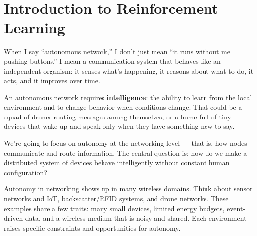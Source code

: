 \chapter{Introduction to Reinforcement Learning}
When I say “autonomous network,” I don’t just mean “it runs without me pushing buttons.” I mean a communication system that behaves like an independent organism: it senses what’s happening, it reasons about what to do, it acts, and it improves over time. 

\begin{redbar}
An autonomous network requires \textbf{intelligence}: the ability to learn from the local environment and to change behavior when conditions change. That could be a squad of drones routing messages among themselves, or a home full of tiny devices that wake up and speak only when they have something new to say.
\end{redbar}

We’re going to focus on autonomy at the networking level — that is, how nodes communicate and route information. The central question is: how do we make a distributed system of devices behave intelligently without constant human configuration?

Autonomy in networking shows up in many wireless domains. Think about sensor networks and IoT, backscatter/RFID systems, and drone networks. These examples share a few traits: many small devices, limited energy budgets, event-driven data, and a wireless medium that is noisy and shared. Each environment raises specific constraints and opportunities for autonomy.

